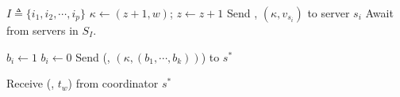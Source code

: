 \label{app:algrithmC}
\begin{algorithm*}[!ht]
  \begin{algorithmic}[2]
  
    \begin{multicols}{3}{\footnotesize
          \EndPart
          \State $I\triangleq \{i_1, i_2, \cdots, i_p \}$
        \Part{ \underline{\writeValue}} {
                \State ${\kappa} \leftarrow (z +1,  w)$; $z \leftarrow z +1 $
            \State Send \writeValueTag, $({\kappa}, v_{s_i})$ to server $s_i$
           \EndFor 
          \State  Await {\ackTag} from servers in  $S_I$.
        }\EndPart
        \Statex
            \Part{ \underline{\informSerializer}} {

             \State $b_i \leftarrow 1$
             \Else
               \State $b_i \leftarrow 0$
            \EndIf
           \EndFor 
                                            \State  Send  (\informSerializerTag, $({\kappa}, (b_{1}, \cdots, b_{k}))$) to   $s^*$

          \State Receive ({\ackTag}, $t_w$) from  coordinator $s^*$
        }\EndPart
      }\end{multicols}
  

\end{algorithmic}
\end{algorithm*}
